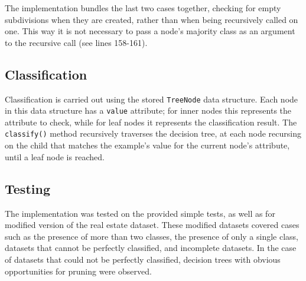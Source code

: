 \documentclass[10pt, titlepage]{article}
\begin{document}
The implementation bundles the last two cases together, checking for empty subdivisions when they are created, rather than when being recursively called on one. This way it is not necessary to pass a node's majority class as an argument to the recursive call (see lines 158-161).


\subsection{Classification}
Classification is carried out using the stored \texttt{TreeNode} data structure. Each node in this data structure has a \texttt{value} attribute; for inner nodes this represents the attribute to check, while for leaf nodes it represents the classification result. The \texttt{classify()} method recursively traverses the decision tree, at each node recursing on the child that matches the example's value for the current node's attribute, until a leaf node is reached.

\subsection{Testing}
The implementation was tested on the provided simple tests, as well as for modified version of the real estate dataset. These modified datasets covered cases such as the presence of more than two classes, the presence of only a single class, datasets that cannot be perfectly classified, and incomplete datasets. In the case of datasets that could not be perfectly classified, decision trees with obvious opportunities for pruning were observed.
\end{document}

